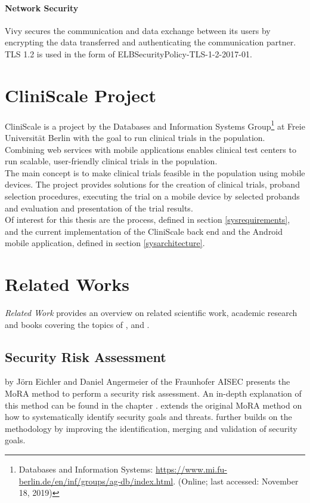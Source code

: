     \paragraph{Network Security} Vivy secures the communication and data exchange between its users by encrypting the data transferred and authenticating the communication partner. TLS 1.2 is used in the form of ELBSecurityPolicy-TLS-1-2-2017-01.


\section{CliniScale Project}
\label{cliniscale}
CliniScale is a project by the Databases and Information Systems Group\footnote{Databases and Information Systems: \url{https://www.mi.fu-berlin.de/en/inf/groups/ag-db/index.html}. (Online; last accessed:  November 18, 2019)} at Freie Universität Berlin with the goal to run clinical trials in the population. Combining web services with mobile applications enables clinical test centers to run scalable, user-friendly clinical trials in the population.\\
The main concept is to make clinical trials feasible in the population using mobile devices. The project provides solutions for the creation of clinical trials, proband selection procedures, executing the trial on a mobile device by selected probands and evaluation and presentation of the trial results.\\
Of interest for this thesis are the process, defined in section \ref{sysrequirements}, and the current implementation of the CliniScale back end and the Android mobile application, defined in section \ref{sysarchitecture}.


\section{Related Works}
\label{relatedwork}
\textit{Related Work} provides an overview on related scientific work, academic research and books covering the topics of
\textit{}, \textit{} and \textit{}.

\subsection{Security Risk Assessment}
\label{subsection:riskass}


\cite{mora} by Jörn Eichler and Daniel Angermeier of the Fraunhofer AISEC presents the MoRA method to perform a security risk assessment. An in-depth explanation of this method can be found in the chapter . \cite{angermeier2016systematic} extends the original MoRA method on how to systematically identify security goals and threats. \cite{morasecgoals} further builds on the methodology by improving the identification, merging and validation of security goals.

